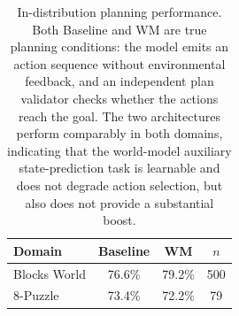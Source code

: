 \begin{table}[t]
\centering
\caption{In-distribution planning performance. Both Baseline and WM are true planning conditions: the model emits an action sequence without environmental feedback, and an independent plan validator checks whether the actions reach the goal. The two architectures perform comparably in both domains, indicating that the world-model auxiliary state-prediction task is learnable and does not degrade action selection, but also does not provide a substantial boost.}
\label{tab:planning-indist}
\begin{tabular}{lccc}
\toprule
Domain & Baseline & WM & $n$ \\
\midrule
Blocks World & 76.6\% & 79.2\% & 500 \\
8-Puzzle & 73.4\% & 72.2\% & 79 \\
\bottomrule
\end{tabular}
\end{table}
